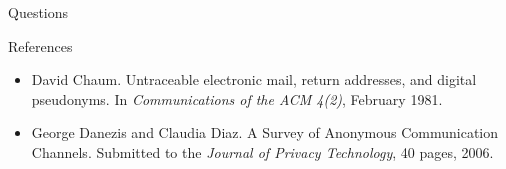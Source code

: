 \documentclass[default,pdf,colorBG,slideColor]{prosper}
\begin{document}
\begin{slide}{Questions}

\end{slide}

\begin{slide}{References}
\begin{itemize}
\item David Chaum. Untraceable electronic mail, return addresses, and digital pseudonyms. In \emph{Communications of the ACM 4(2)}, February 1981.
\item George Danezis and Claudia Diaz. A Survey of Anonymous Communication Channels. Submitted to the \emph{Journal of Privacy Technology}, 40 pages, 2006.
\end{itemize}
\end{slide}
\end{document}
